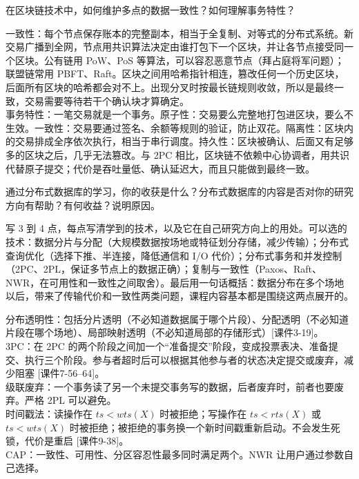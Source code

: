 \documentclass[10pt,a4paper]{article}
\newcommand{\kj}[1]{\textsf{\small[课件#1]}}
\newenvironment{keep}{\par\noindent\begin{minipage}{\linewidth}\setlength{\parskip}{3pt plus 1pt}}{\end{minipage}\par\vspace{2pt}}
\begin{document}
\begin{keep}
\begin{prob}[2019 年第 5 题（6 分）]
在区块链技术中，如何维护多点的数据一致性？如何理解事务特性？
\end{prob}
\begin{ans}
一致性：每个节点保存账本的完整副本，相当于全复制、对等式的分布式系统。新交易广播到全网，节点用共识算法决定由谁打包下一个区块，并让各节点接受同一个区块。公有链用 PoW、PoS 等算法，可以容忍恶意节点（拜占庭将军问题）；联盟链常用 PBFT、Raft。区块之间用哈希指针相连，篡改任何一个历史区块，后面所有区块的哈希都会对不上。出现分叉时按最长链规则收敛，所以是最终一致，交易需要等待若干个确认块才算确定。\\
事务特性：一笔交易就是一个事务。原子性：交易要么完整地打包进区块，要么不生效。一致性：交易要通过签名、余额等规则的验证，防止双花。隔离性：区块内的交易排成全序依次执行，相当于串行调度。持久性：区块被确认、后面又有足够多的区块之后，几乎无法篡改。与 2PC 相比，区块链不依赖中心协调者，用共识代替原子提交；代价是吞吐量低、确认延迟大，而且只能做到最终一致。
\end{ans}
\end{keep}

\begin{keep}
\begin{prob}[2005 年第 5.2 题、2006 年第 6 题]
通过分布式数据库的学习，你的收获是什么？\quad 分布式数据库的内容是否对你的研究方向有帮助？有何收益？说明原因。
\end{prob}
\begin{var}[作答方法]
\small 写 3 到 4 点，每点写清学到的技术，以及它在自己研究方向上的用处。可以选的技术：数据分片与分配（大规模数据按场地或特征划分存储，减少传输）；分布式查询优化（选择下推、半连接，降低通信和 I/O 代价）；分布式事务和并发控制（2PC、2PL，保证多节点上的数据正确）；复制与一致性（Paxos、Raft、NWR，在可用性和一致性之间取舍）。最后用一句话概括：数据分布在多个场地以后，带来了传输代价和一致性两类问题，课程内容基本都是围绕这两点展开的。
\end{var}
\end{keep}

\begin{var}[可能出现的其他概念]
\small
分布透明性：包括分片透明（不必知道数据属于哪个片段）、分配透明（不必知道片段在哪个场地）、局部映射透明（不必知道局部的存储形式）\kj{3-19}。\\
3PC：在 2PC 的两个阶段之间加一个“准备提交”阶段，变成投票表决、准备提交、执行三个阶段。参与者超时后可以根据其他参与者的状态决定提交或废弃，减少阻塞 \kj{7-56--64}。\\
级联废弃：一个事务读了另一个未提交事务写的数据，后者废弃时，前者也要废弃。严格 2PL 可以避免。\\
时间戳法：读操作在 $ts<wts(X)$ 时被拒绝；写操作在 $ts<rts(X)$ 或 $ts<wts(X)$ 时被拒绝；被拒绝的事务换一个新时间戳重新启动。不会发生死锁，代价是重启 \kj{9-38}。\\
CAP：一致性、可用性、分区容忍性最多同时满足两个。NWR 让用户通过参数自己选择。
\end{var}
\end{document}
